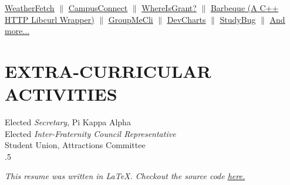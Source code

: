 \documentclass[margin=0.5in, 10pt]{res} %
\begin{document}
\begin{resume}
\underline{\color{blue}\href{http://www.weatherfetch.com}{WeatherFetch}} $\parallel$ \underline{\color{blue}\href{http://campusconnect.herokuapp.com}{CampusConnect}} $\parallel$
\underline{\color{blue}\href{http://whereisgrant.herokuapp.com}{WhereIsGrant?}} $\parallel$
\href{https://github.com/g12mcgov/Barbeque}{\underline {\color{blue} Barbeque} (A C++ HTTP Libcurl Wrapper)} $\parallel$
\underline{\color{blue}\href{https://github.com/g12mcgov/GroupMeCli}{GroupMeCli}} $\parallel$
\underline{\color{blue}\href{https://github.com/g12mcgov/DevCharts}{DevCharts}} $\parallel$
\underline{\color{blue}\href{https://github.com/g12mcgov/StudyBug}{StudyBug}} $\parallel$ \underline{\color{blue}\href{https://github.com/g12mcgov}{And more...}}




\section{EXTRA-CURRICULAR ACTIVITIES} 

Elected {\it Secretary}, Pi Kappa Alpha \\
Elected {\it Inter-Fraternity Council Representative} \\
Student Union, Attractions Committee \\


\moveleft.5\hoffset\centerline{{\small\sl This resume was written in \LaTeX. Checkout the source code \color{blue}\underline{\href{http://www.github.com/g12mcgov}{here}.}}}


\end{resume}
\end{document}

